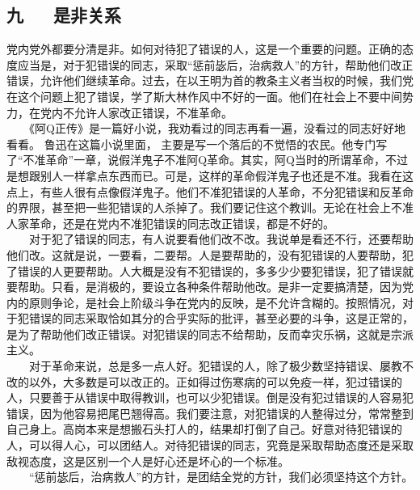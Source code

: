 \documentclass[cn,11pt,chinese]{elegantbook}
\def\myformat#1{\hfil\hfil #1}
\begin{document}
\subsection*{\myformat{九 　  是非关系}}
党内党外都要分清是非。如何对待犯了错误的人，这是一个重要的问题。正确的态度应当是，对于犯错误的同志，采取“惩前毖后，治病救人”的方针，帮助他们改正错误，允许他们继续革命。过去，在以王明为首的教条主义者当权的时候，我们党在这个问题上犯了错误，学了斯大林作风中不好的一面。他们在社会上不要中间势力，在党内不允许人家改正错误，不准革命。\\
　　《阿Q正传》是一篇好小说，我劝看过的同志再看一遍，没看过的同志好好地看看。 鲁迅在这篇小说里面， 主要是写一个落后的不觉悟的农民。他专门写了“不准革命”一章，说假洋鬼子不准阿Q革命。其实，阿Q当时的所谓革命，不过是想跟别人一样拿点东西而已。可是，这样的革命假洋鬼子也还是不准。我看在这点上，有些人很有点像假洋鬼子。他们不准犯错误的人革命，不分犯错误和反革命的界限，甚至把一些犯错误的人杀掉了。我们要记住这个教训。无论在社会上不准人家革命，还是在党内不准犯错误的同志改正错误，都是不好的。\\
　　对于犯了错误的同志，有人说要看他们改不改。我说单是看还不行，还要帮助他们改。这就是说，一要看，二要帮。人是要帮助的，没有犯错误的人要帮助，犯了错误的人更要帮助。人大概是没有不犯错误的，多多少少要犯错误，犯了错误就要帮助。只看，是消极的，要设立各种条件帮助他改。是非一定要搞清楚，因为党内的原则争论，是社会上阶级斗争在党内的反映，是不允许含糊的。按照情况，对于犯错误的同志采取恰如其分的合乎实际的批评，甚至必要的斗争，这是正常的，是为了帮助他们改正错误。对犯错误的同志不给帮助，反而幸灾乐祸，这就是宗派主义。\\
　　对于革命来说，总是多一点人好。犯错误的人，除了极少数坚持错误、屡教不改的以外，大多数是可以改正的。正如得过伤寒病的可以免疫一样，犯过错误的人，只要善于从错误中取得教训，也可以少犯错误。倒是没有犯过错误的人容易犯错误，因为他容易把尾巴翘得高。我们要注意，对犯错误的人整得过分，常常整到自己身上。高岗本来是想搬石头打人的，结果却打倒了自己。好意对待犯错误的人，可以得人心，可以团结人。对待犯错误的同志，究竟是采取帮助态度还是采取敌视态度，这是区别一个人是好心还是坏心的一个标准。\\
　　“惩前毖后，治病救人”的方针，是团结全党的方针，我们必须坚持这个方针。\\
\end{document}
